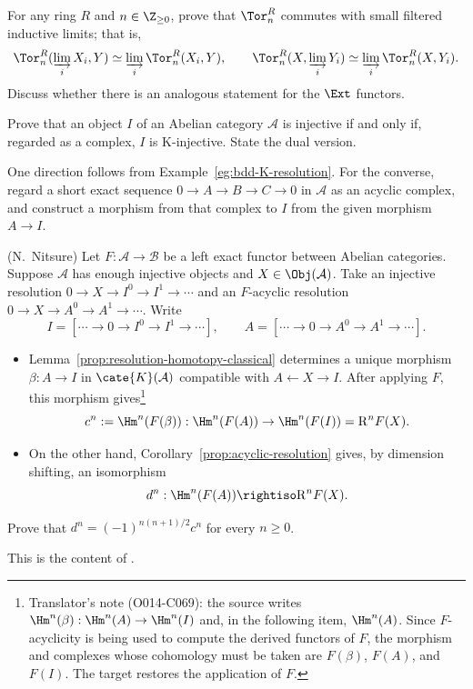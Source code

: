 \begin{Exercises}
	\item For any ring $R$ and $n\in\Z_{\geq0}$, prove that $\Tor_n^R$
	commutes with small filtered inductive limits; that is,
	\[
		\Tor_n^R(\varinjlim_iX_i,Y)
		\simeq\varinjlim_i\Tor_n^R(X_i,Y),
		\qquad
		\Tor_n^R(X,\varinjlim_iY_i)
		\simeq\varinjlim_i\Tor_n^R(X,Y_i).
	\]
	Discuss whether there is an analogous statement for the $\Ext$ functors.

	\item Prove that an object $I$ of an Abelian category $\mathcal{A}$ is
	injective if and only if, regarded as a complex, $I$ is K-injective. State
	the dual version.
	\begin{hint}
		One direction follows from Example~\ref{eg:bdd-K-resolution}. For the
		converse, regard a short exact sequence
		$0\to A\to B\to C\to0$ in $\mathcal{A}$ as an acyclic complex, and
		construct a morphism from that complex to $I$ from the given morphism
		$A\to I$.
	\end{hint}

	\item (N.\ Nitsure) Let $F:\mathcal{A}\to\mathcal{B}$ be a left exact
	functor between Abelian categories. Suppose $\mathcal{A}$ has enough
	injective objects and $X\in\Obj(\mathcal{A})$. Take an injective resolution
	$0\to X\to I^0\to I^1\to\cdots$ and an $F$-acyclic resolution
	$0\to X\to A^0\to A^1\to\cdots$. Write
	\[
		I=[\cdots\to0\to I^0\to I^1\to\cdots],
		\qquad
		A=[\cdots\to0\to A^0\to A^1\to\cdots].
	\]
	\begin{itemize}
		\item Lemma~\ref{prop:resolution-homotopy-classical} determines a
		unique morphism $\beta:A\to I$ in $\cate{K}(\mathcal{A})$ compatible
		with $A\leftarrow X\rightarrow I$. After applying $F$, this morphism
		gives\footnote{Translator's note (O014-C069): the source writes
		$\Hm^n(\beta):\Hm^n(A)\to\Hm^n(I)$ and, in the following item,
		$\Hm^n(A)$. Since $F$-acyclicity is being used to compute the derived
		functors of $F$, the morphism and complexes whose cohomology must be
		taken are $F(\beta)$, $F(A)$, and $F(I)$. The target restores the
		application of $F$.}
		\[
			c^n:=\Hm^n(F(\beta)):
			\Hm^n(F(A))\to\Hm^n(F(I))=\mathrm{R}^nF(X).
		\]
		\item On the other hand, Corollary~\ref{prop:acyclic-resolution} gives,
		by dimension shifting, an isomorphism
		\[
			d^n:\Hm^n(F(A))\rightiso\mathrm{R}^nF(X).
		\]
	\end{itemize}
	Prove that $d^n=(-1)^{n(n+1)/2}c^n$ for every $n\geq0$.
	\begin{hint}
		This is the content of \cite{Ni09}.
	\end{hint}
\end{Exercises}
